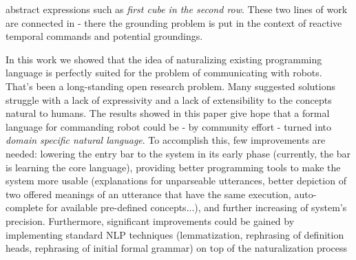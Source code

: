 abstract expressions such as \emph{first cube in the second row}. These two lines of work are connected in \cite{boteanuVerifiableGrounding} - there the grounding problem is put in the context of reactive temporal commands and potential groundings. \par In this work we showed that the idea of naturalizing existing programming language is perfectly suited for the problem of communicating with robots. That's been a long-standing open research problem. Many suggested solutions struggle with a lack of expressivity and a lack of extensibility to the concepts natural to humans. The results showed in this paper give hope that a formal language for commanding robot could be - by community effort - turned into \emph{domain specific natural language}. To accomplish this, few improvements are needed: lowering the entry bar to the system in its early phase (currently, the bar is learning the core language), providing better programming tools to make the system more usable (explanations for unparseable utterances, better depiction of two offered meanings of an utterance that have the same execution, auto-complete for available pre-defined concepts...), and further increasing of system's precision. Furthermore, significant improvements could be gained by implementing standard NLP techniques (lemmatization, rephrasing of definition heads, rephrasing of initial formal grammar) on top of the naturalization process
